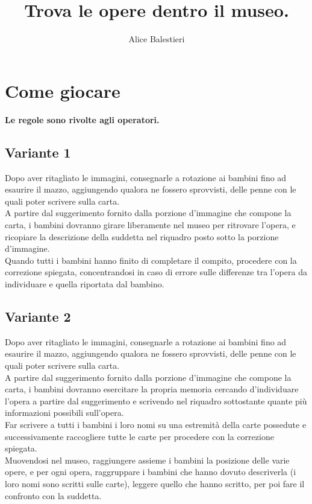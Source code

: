 \documentclass[hidelinks,12pt,a4paper]{article}
\begin{document}
	
	\title{\textbf{\\Trova le opere dentro il museo.}}
	\author{Alice Balestieri}
	\date{}
	
	\maketitle
	\newpage
	
	\tableofcontents
	\newpage
	
	\section{Come giocare}
	\begin{center}
		\textbf{Le regole sono rivolte agli operatori.}
	\end{center}
	
	\subsection{Variante 1}
	Dopo aver ritagliato le immagini, consegnarle a rotazione ai bambini fino ad esaurire il mazzo, aggiungendo qualora ne fossero sprovvisti, delle penne con le quali poter scrivere sulla carta.\\
	A partire dal suggerimento fornito dalla porzione d'immagine che compone la carta, i bambini dovranno girare liberamente nel museo per ritrovare l'opera, e ricopiare la descrizione della suddetta nel riquadro posto sotto la porzione d'immagine.\\
	Quando tutti i bambini hanno finito di completare il compito, procedere con la correzione spiegata, concentrandosi in caso di errore sulle differenze tra l'opera da individuare e quella riportata dal bambino.
	
	\subsection{Variante 2}
	Dopo aver ritagliato le immagini, consegnarle a rotazione ai bambini fino ad esaurire il mazzo, aggiungendo qualora ne fossero sprovvisti, delle penne con le quali poter scrivere sulla carta.\\
	A partire dal suggerimento fornito dalla porzione d'immagine che compone la carta, i bambini dovranno esercitare la propria memoria cercando d'individuare l'opera a partire dal suggerimento e scrivendo nel riquadro sottostante quante più informazioni possibili sull'opera.\\
	Far scrivere a tutti i bambini i loro nomi su una estremità della carte possedute e successivamente raccogliere tutte le carte per procedere con la correzione spiegata.\\
	 Muovendosi nel museo, raggiungere assieme i bambini la posizione delle varie opere, e per ogni opera, raggruppare i bambini che hanno dovuto descriverla (i loro nomi sono scritti sulle carte), leggere quello che hanno scritto, per poi fare il confronto con la suddetta.
	
\end{document}
